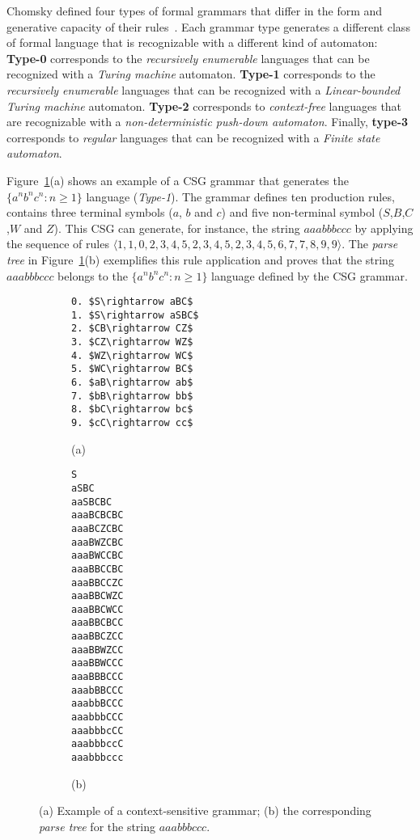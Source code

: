 \documentclass[letterpaper]{article} %
\newcommand{\tup}[1]{{\langle #1 \rangle}}
\begin{document}
Chomsky defined four types of formal grammars that differ in the form and generative capacity of their rules~\cite{chomsky2002syntactic}. Each grammar type generates a different class of formal language that is recognizable with a different kind of automaton: {\bf Type-0} corresponds to the {\em recursively enumerable} languages that can be recognized with a {\em Turing machine} automaton. {\bf Type-1} corresponds to the {\em recursively enumerable} languages that can be recognized with a {\em Linear-bounded Turing machine} automaton. {\bf Type-2} corresponds to {\em context-free} languages that are recognizable with a {\em non-deterministic push-down automaton}. Finally, {\bf type-3} corresponds to {\em regular} languages that can be recognized with a {\em Finite state automaton}.

Figure~\ref{fig:csg}(a) shows an example of a CSG grammar that generates the $\{a^nb^nc^n : n \geq 1 \}$ language ({\em Type-1}). The grammar defines ten production rules, contains three terminal symbols ($a$, $b$ and $c$) and five non-terminal symbol ($S$,$B$,$C$,$W$ and $Z$). This CSG can generate, for instance, the string $aaabbbccc$ by applying the sequence of rules $\tup{1,1,0,2,3,4,5,2,3,4,5,2,3,4,5,6,7,7,8,9,9}$. The {\it parse tree} in Figure~\ref{fig:csg}(b) exemplifies this rule application and proves that the string $aaabbbccc$ belongs to the $\{a^nb^nc^n : n \geq 1 \}$ language defined by the CSG grammar.

\begin{figure}
    \begin{subfigure}[]{0.3\textwidth}
      \begin{lstlisting}
0. $S\rightarrow aBC$
1. $S\rightarrow aSBC$
2. $CB\rightarrow CZ$
3. $CZ\rightarrow WZ$
4. $WZ\rightarrow WC$
5. $WC\rightarrow BC$
6. $aB\rightarrow ab$
7. $bB\rightarrow bb$	
8. $bC\rightarrow bc$
9. $cC\rightarrow cc$     
      \end{lstlisting}

	\hspace*{1.8cm}(a)
  \end{subfigure}
  \begin{subfigure}[]{0.15\textwidth}
  \begin{tiny}  
\begin{lstlisting}
S
aSBC
aaSBCBC
aaaBCBCBC
aaaBCZCBC
aaaBWZCBC
aaaBWCCBC
aaaBBCCBC
aaaBBCCZC
aaaBBCWZC
aaaBBCWCC
aaaBBCBCC
aaaBBCZCC
aaaBBWZCC
aaaBBWCCC
aaaBBBCCC
aaabBBCCC
aaabbBCCC
aaabbbCCC
aaabbbcCC
aaabbbccC
aaabbbccc 
\end{lstlisting}
  \end{tiny}    
\hspace*{.3cm}(b)
  \end{subfigure}

  \caption{\small (a) Example of a context-sensitive grammar; (b) the corresponding {\it parse tree} for the string $aaabbbccc$.}
  \label{fig:csg}
\end{figure}
\end{document}
